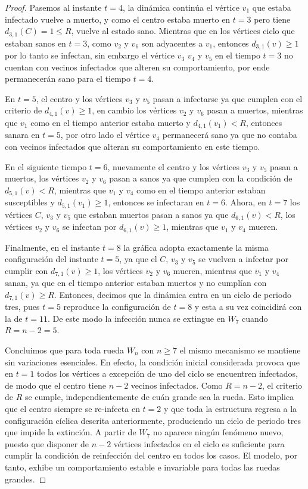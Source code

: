 \documentclass[12pt,titlepage,twoside,openright]{book}
\begin{document}
\begin{proof}
    Pasemos al instante $t=4$, la din\'amica contin\'ua el v\'ertice $v_1$ que estaba infectado vuelve a muerto, y como el centro estaba muerto en $t=3$ pero tiene $d_{3,1}(C)=1\leq R$, vuelve al estado sano. Mientras que en los v\'ertices ciclo que estaban sanos en $t=3$, como $v_2$ y $v_6$ son adyacentes a $v_1$, entonces $d_{3,1}(v) \geq 1$ por lo tanto se infectan, sin embargo el v\'ertice $v_3$ $v_4$ y $v_5$ en el tiempo $t=3$ no cuentan con vecinos infectados que alteren su comportamiento, por ende permanecer\'an sano para el tiempo $t=4$.

    En $t=5$, el centro y los v\'ertices $v_3$ y $v_5$ pasan a infectarse ya que cumplen con el criterio de $d_{4,1}(v)\geq 1$, en cambio los v\'ertices $v_2$ y $v_6$ pasan a muertos, mientras que $v_1$ como en el tiempo anterior estaba muerto y $d_{4,1}(v_1) < R$, entonces sanara en $t=5$, por otro lado el v\'ertice $v_4$ permanecer\'a sano ya que no contaba con vecinos infectados que alteran su comportamiento en este tiempo. 
    
    En el siguiente tiempo $t=6$, nuevamente el centro y los v\'ertices $v_3$ y $v_5$ pasan a muertos, los v\'ertices $v_2$ y $v_6$ pasan a sanos ya que cumplen con la condici\'on de $d_{5,1}(v) < R$, mientras que $v_1$ y $v_4$ como en el tiempo anterior estaban susceptibles y $d_{5,1}(v_1) \geq 1$, entonces se infectaran en $t=6$. Ahora, en $t=7$ los v\'ertices $C$, $v_3$ y $v_5$ que estaban muertos pasan a sanos ya que $d_{6,1}(v) < R$, los v\'ertices $v_2$ y $v_6$ se infectan por $d_{6,1}(v)\geq 1$, mientras que $v_1$ y $v_4$ mueren.

    Finalmente, en el instante $t=8$ la gr\'afica adopta exactamente la misma configuraci\'on del instante $t=5$, ya que el $C$, $v_3$ y $v_5$ se vuelven a infectar por cumplir con $d_{7,1}(v)\geq 1$, los v\'ertices $v_2$ y $v_6$ mueren, mientras que $v_1$ y $v_4$ sanan, ya que en el tiempo anterior estaban muertos y no cumpl\'ian con $d_{7,1}(v) \geq R$. Entonces, decimos que la din\'amica entra en un ciclo de periodo tres, pues $t=5$ reproduce la configuraci\'on de $t=8$ y esta a su vez coincidir\'a con la de $t=11$. De este modo la infecci\'on nunca se extingue en $W_7$ cuando $R=n-2=5$.

    Concluimos que para toda rueda $W_n$ con $n\ge 7$ el mismo mecanismo se mantiene sin variaciones esenciales. En efecto, la condici\'on inicial considerada provoca que en $t=1$ todos los v\'ertices a excepci\'on de uno del ciclo se encuentren infectados, de modo que el centro tiene $n-2$ vecinos infectados. Como $R=n-2$, el criterio de $R$ se cumple, independientemente de cu\'an grande sea la rueda. Esto implica que el centro siempre se re-infecta en $t=2$ y que toda la estructura regresa a la configuraci\'on c\'iclica descrita anteriormente, produciendo un ciclo de periodo tres que impide la extinci\'on. A partir de $W_7$ no aparece ning\'un fen\'omeno nuevo, puesto que disponer de $n-2$ v\'ertices infectados en el ciclo es suficiente para cumplir la condici\'on de reinfecci\'on del centro en todos los casos. El modelo, por tanto, exhibe un comportamiento estable e invariable para todas las ruedas grandes.


\end{proof}
\end{document}
